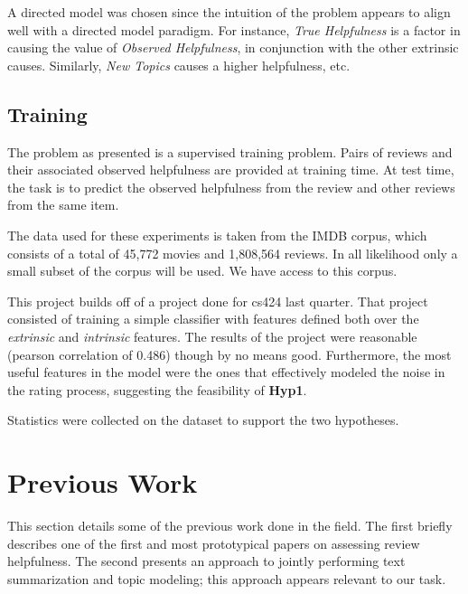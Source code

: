 \documentclass[12pt,letterpaper]{article}
\begin{document}
A directed model was chosen since the intuition of the problem appears to
	align well with a directed model paradigm.
For instance, {\em True Helpfulness} is a factor in causing the value of
	{\em Observed Helpfulness}, in conjunction with the other extrinsic
	causes.
Similarly, {\em New Topics} causes a higher helpfulness, etc.

\subsection{Training}
The problem as presented is a supervised training problem.
Pairs of reviews and their associated observed helpfulness are provided at
	training time.
At test time, the task is to predict the observed helpfulness from the review
	and other reviews from the same item.

The data used for these experiments is taken from the IMDB corpus, which
	consists of a total of 45,772 movies and 1,808,564 reviews.
In all likelihood only a small subset of the corpus will be used.
We have access to this corpus.


This project builds off of a project done for cs424 last quarter.
That project consisted of training a simple classifier with features
	defined both over the {\em extrinsic} and {\em intrinsic} features.
The results of the project were reasonable (pearson correlation of 0.486)
	though by no means good.
Furthermore, the most useful features in the model were the ones that
	effectively modeled the noise in the rating process, suggesting the
	feasibility of {\bf Hyp1}.

Statistics were collected on the dataset to support the two hypotheses.




\section{Previous Work}
This section details some of the previous work done in the field.
The first briefly describes one of the first and most prototypical papers
	on assessing review helpfulness.
The second presents an approach to jointly performing text summarization
	and topic modeling; this approach appears relevant to our task.
\end{document}
